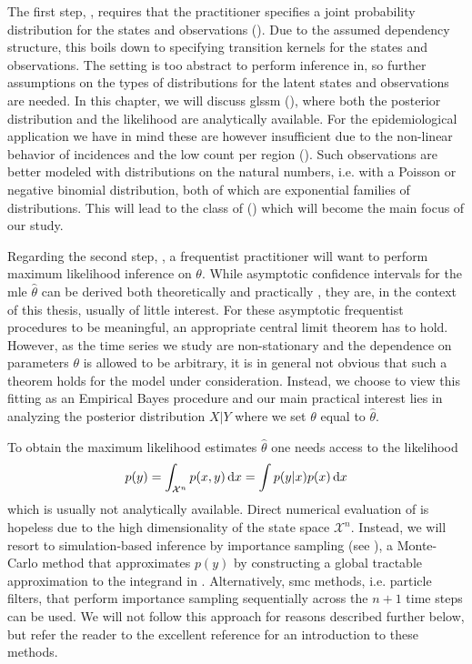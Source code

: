 The first step, , requires that the practitioner specifies a joint probability distribution for the states and observations ().
Due to the assumed dependency structure, this boils down to specifying transition kernels for the states and observations.
The setting  is too abstract to perform inference in, so further assumptions on the types of distributions for the latent states and observations are needed.
In this chapter, we will discuss \gls{glssm}  (), where both the posterior distribution and the likelihood are analytically available. For the epidemiological application we have in mind these are however insufficient due to the non-linear behavior of incidences and the low count per region ().
Such observations are better modeled with distributions on the natural numbers, i.e. with a Poisson or negative binomial distribution, both of which are exponential families of distributions. This will lead to the class of  () which will become the main focus of our study.

Regarding the second step, , a frequentist practitioner will want to perform maximum likelihood inference on $\theta$.
While asymptotic confidence intervals for the \gls{mle} $\hat\theta$ can be derived both theoretically and practically \citep[Chapter 7]{Durbin2012Time}, they are, in the context of this thesis, usually of little interest. For these asymptotic frequentist procedures to be meaningful, an appropriate central limit theorem has to hold. However, as the time series we study are non-stationary and the dependence on parameters $\theta$ is allowed to be arbitrary, it is in general not obvious that such a theorem holds for the model under consideration. Instead, we choose to view this fitting as an Empirical Bayes procedure and our main practical interest lies in analyzing the posterior distribution $X|Y$ where we set $\theta$ equal to $\hat\theta$. 


To obtain the maximum likelihood estimates $\hat\theta$ one needs access to the likelihood
\begin{align}
    \label{eq:likelihood}
    p(y) = \int_{\mathcal X^n} p(x,y) \,\mathrm d x = \int p(y|x) p(x) \,\mathrm d x
\end{align}
which is usually not analytically available.
Direct numerical evaluation of  is hopeless due to the high dimensionality of the state space $\mathcal X^n$.
Instead, we will resort to simulation-based inference by importance sampling (see ), a Monte-Carlo method that approximates $p(y)$ by constructing a global tractable approximation to the integrand in . Alternatively, \gls{smc} methods, i.e. particle filters, that perform importance sampling sequentially across the $n + 1$ time steps can be used. We will not follow this approach for reasons described further below, but refer the reader to the excellent reference \citep{Chopin2020Introduction} for an introduction to these methods.

